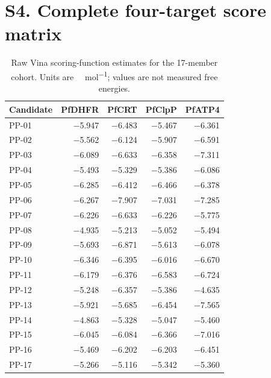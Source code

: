 \documentclass[journal=jcisd8,manuscript=suppinfo]{achemso}
\begin{document}
\section*{S4. Complete four-target score matrix}
\begin{table}[h]
\centering
\caption{Raw Vina scoring-function estimates for the 17-member cohort. Units are \si{\kilo\calorie\per\mole}; values are not measured free energies.}
\label{tab:vina_matrix}
\small
\begin{tabular}{@{}lrrrr@{}}
\toprule
Candidate & PfDHFR & PfCRT & PfClpP & PfATP4 \\
\midrule
PP-01 & \num{-5.947} & \num{-6.483} & \num{-5.467} & \num{-6.361} \\
PP-02 & \num{-5.562} & \num{-6.124} & \num{-5.907} & \num{-6.591} \\
PP-03 & \num{-6.089} & \num{-6.633} & \num{-6.358} & \num{-7.311} \\
PP-04 & \num{-5.493} & \num{-5.329} & \num{-5.386} & \num{-6.086} \\
PP-05 & \num{-6.285} & \num{-6.412} & \num{-6.466} & \num{-6.378} \\
PP-06 & \num{-6.267} & \num{-7.907} & \num{-7.031} & \num{-7.285} \\
PP-07 & \num{-6.226} & \num{-6.633} & \num{-6.226} & \num{-5.775} \\
PP-08 & \num{-4.935} & \num{-5.213} & \num{-5.052} & \num{-5.494} \\
PP-09 & \num{-5.693} & \num{-6.871} & \num{-5.613} & \num{-6.078} \\
PP-10 & \num{-6.346} & \num{-6.395} & \num{-6.016} & \num{-6.670} \\
PP-11 & \num{-6.179} & \num{-6.376} & \num{-6.583} & \num{-6.724} \\
PP-12 & \num{-5.248} & \num{-6.357} & \num{-5.386} & \num{-4.635} \\
PP-13 & \num{-5.921} & \num{-5.685} & \num{-6.454} & \num{-7.565} \\
PP-14 & \num{-4.863} & \num{-5.328} & \num{-5.047} & \num{-5.460} \\
PP-15 & \num{-6.045} & \num{-6.084} & \num{-6.366} & \num{-7.016} \\
PP-16 & \num{-5.469} & \num{-6.202} & \num{-6.203} & \num{-6.451} \\
PP-17 & \num{-5.266} & \num{-5.116} & \num{-5.342} & \num{-5.360} \\
\bottomrule
\end{tabular}
\end{table}
\end{document}
